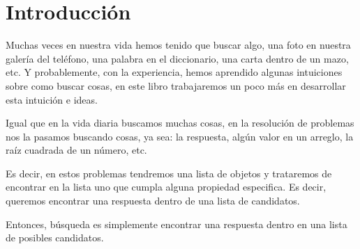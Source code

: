 \chapter*{Introducción}


Muchas veces en nuestra vida hemos tenido que buscar algo, una foto en nuestra galería del teléfono, una palabra en el diccionario, una carta dentro de un mazo, etc. Y probablemente, con la experiencia, hemos aprendido algunas intuiciones sobre como buscar cosas, en este libro trabajaremos un poco más en desarrollar esta intuición e ideas.

Igual que en la vida diaria buscamos muchas cosas, en la resolución de problemas nos la pasamos buscando cosas, ya sea: la respuesta, algún valor en un arreglo, la raíz cuadrada de un número, etc.

Es decir, en estos problemas tendremos una lista de objetos y trataremos de encontrar en la lista uno que cumpla alguna propiedad especifica. Es decir, queremos encontrar una respuesta dentro de una lista de candidatos.

Entonces, búsqueda es simplemente encontrar una respuesta dentro en una lista de posibles candidatos.
